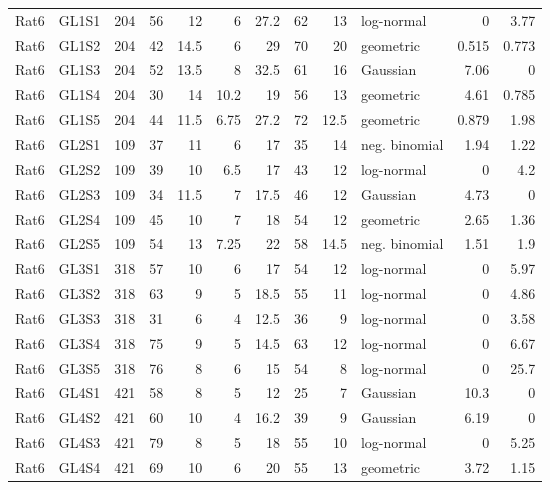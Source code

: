 \begin{table}[htbp]
\begin{tabular}{llrrrrrrrlrr}
Rat6 & GL1S1 & 204 & 56 & 12 & 6 & 27.2 & 62 & 13 & log-normal & 0 & 3.77 \\
Rat6 & GL1S2 & 204 & 42 & 14.5 & 6 & 29 & 70 & 20 & geometric & 0.515 & 0.773 \\
Rat6 & GL1S3 & 204 & 52 & 13.5 & 8 & 32.5 & 61 & 16 & Gaussian & 7.06 & 0 \\
Rat6 & GL1S4 & 204 & 30 & 14 & 10.2 & 19 & 56 & 13 & geometric & 4.61 & 0.785 \\
Rat6 & GL1S5 & 204 & 44 & 11.5 & 6.75 & 27.2 & 72 & 12.5 & geometric & 0.879 & 1.98 \\
Rat6 & GL2S1 & 109 & 37 & 11 & 6 & 17 & 35 & 14 & neg. binomial & 1.94 & 1.22 \\
Rat6 & GL2S2 & 109 & 39 & 10 & 6.5 & 17 & 43 & 12 & log-normal & 0 & 4.2 \\
Rat6 & GL2S3 & 109 & 34 & 11.5 & 7 & 17.5 & 46 & 12 & Gaussian & 4.73 & 0 \\
Rat6 & GL2S4 & 109 & 45 & 10 & 7 & 18 & 54 & 12 & geometric & 2.65 & 1.36 \\
Rat6 & GL2S5 & 109 & 54 & 13 & 7.25 & 22 & 58 & 14.5 & neg. binomial & 1.51 & 1.9 \\
Rat6 & GL3S1 & 318 & 57 & 10 & 6 & 17 & 54 & 12 & log-normal & 0 & 5.97 \\
Rat6 & GL3S2 & 318 & 63 & 9 & 5 & 18.5 & 55 & 11 & log-normal & 0 & 4.86 \\
Rat6 & GL3S3 & 318 & 31 & 6 & 4 & 12.5 & 36 & 9 & log-normal & 0 & 3.58 \\
Rat6 & GL3S4 & 318 & 75 & 9 & 5 & 14.5 & 63 & 12 & log-normal & 0 & 6.67 \\
Rat6 & GL3S5 & 318 & 76 & 8 & 6 & 15 & 54 & 8 & log-normal & 0 & 25.7 \\
Rat6 & GL4S1 & 421 & 58 & 8 & 5 & 12 & 25 & 7 & Gaussian & 10.3 & 0 \\
Rat6 & GL4S2 & 421 & 60 & 10 & 4 & 16.2 & 39 & 9 & Gaussian & 6.19 & 0 \\
Rat6 & GL4S3 & 421 & 79 & 8 & 5 & 18 & 55 & 10 & log-normal & 0 & 5.25 \\
Rat6 & GL4S4 & 421 & 69 & 10 & 6 & 20 & 55 & 13 & geometric & 3.72 & 1.15 \\
\bottomrule
\end{tabular}
\end{table}
